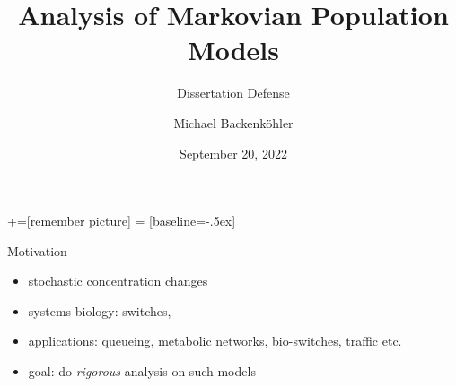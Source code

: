 \documentclass[9pt]{beamer}
\title{Analysis of Markovian Population Models}
\subtitle{Dissertation Defense}
\author{Michael Backenk\"{o}hler}
\institute{Saarland Informatics Campus}
\date{September 20, 2022}
\begin{document}
+=[remember picture]
 = [baseline=-.5ex]

\begin{frame}
\titlepage
\end{frame}

\begin{frame}{Motivation}
  \begin{itemize}
    \item stochastic concentration changes
    \item systems biology: switches, 
    \item applications: queueing, metabolic networks, bio-switches, traffic etc.
    \item goal: do \emph{rigorous} analysis on such models
  \end{itemize}
\end{frame}
\end{document}
